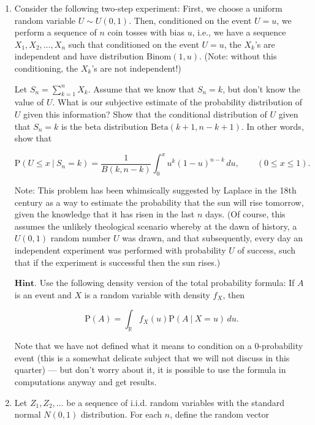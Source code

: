 \documentclass[11pt]{report}
\newcommand{\R}{\mathbb{R}}
\theoremstyle{plain}
\theoremstyle{definition}
\begin{document}
\begin{enumerate}[label=\arabic*.]
(b) Take $n=365$. Assuming that the approximation $F_{T_n/\sqrt{n}} \approx F_{\textrm{birthday}}$ is good for such a value of $n$, estimate what is the minimal number of students that have to be put into a classroom so that the probability that two of them have the same birthday exceeds 50\%. (Ignore leap years, and assume for simplicity that birthdays are distributed uniformly throughout the year; in practice this is not entirely true.)
\item Consider the following two-step experiment: First, we choose a uniform random variable $U \sim U(0,1)$. Then, conditioned on the event $U=u$, we perform a sequence of $n$ coin tosses with bias $u$, i.e., we have a sequence $X_1,X_2,\ldots,X_n$ such that conditioned on the event $U=u$, the $X_k$'s are independent and have distribution $\textrm{Binom}(1,u)$. (Note: without this conditioning, the $X_k$'s are not independent!)

Let $S_n = \sum_{k=1}^n X_k$. Assume that we know that $S_n=k$, but don't know the value of $U$. What is our subjective estimate of the probability distribution of $U$ given this information? Show that the conditional distribution of $U$ given that $S_n = k$ is the beta distribution $\textrm{Beta}(k+1,n-k+1)$. In other words, show that

\[
\mathrm{P}(U \le x\ |\ S_n = k) = \frac{1}{B(k,n-k)} \int_0^x u^k (1-u)^{n-k}\,du, \qquad (0\le x\le 1).
\]

Note: This problem has been whimsically suggested by Laplace in the 18th century as a way to estimate the probability that the sun will rise tomorrow, given the knowledge that it has risen in the last $n$ days. (Of course, this assumes the unlikely theological scenario whereby at the dawn of history, a $U(0,1)$ random number $U$ was drawn, and that subsequently, every day an independent experiment was performed with probability $U$ of success, such that if the experiment is successful then the sun rises.)

$\textbf{Hint.}$ Use the following density version of the total probability formula: If $A$ is an event and $X$ is a random variable with density $f_X$, then

\[
\mathrm{P}(A) = \int_{\R} f_X(u) \mathrm{P}(A\ |\ X=u)\,du.
\]

Note that we have not defined what it means to condition on a 0-probability event (this is a somewhat delicate subject that we will not discuss in this quarter) --- but don't worry about it, it is possible to use the formula in computations anyway and get results.
\item Let $Z_1,Z_2,\ldots$ be a sequence of i.i.d. random variables with the standard normal $N(0,1)$ distribution. For each $n$, define the random vector


\end{enumerate}
\end{document}
